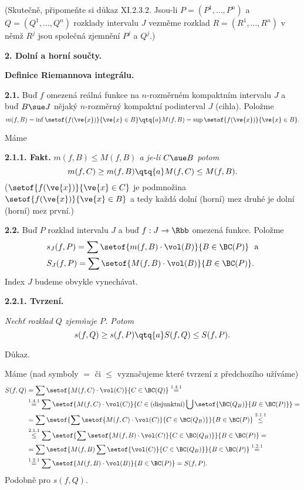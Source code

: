 \documentclass[12pt]{article}
\begin{document}
 (Skutečně, připomeňte si důkaz XI.2.3.2. Jsou-li $P=(P^1,\dots,P^n)$ a  $Q=(Q^1,\dots,Q^n)$ rozklady intervalu $J$
 vezměme rozklad  $R=(R^1,\dots,R^n)$ v němž $R^j$ jsou společná zjemnění $P^j$ a $Q^j$.)
 
 \vskip10mm
 
  
 {\large\bf 2. Dolní a horní součty.}
 
  \medskip
 
 \hskip7mm {\large\bf Definice Riemannova integrálu.}
 
 \bigskip
 
{\bf 2.1.} Buď $f$  omezená reálná funkce na $n$-rozměrném  kompaktním intervalu  $J$ a buď $B\sue J$ nějaký $n$-rozměrný kompaktní podinterval $J$ (cihla). Položme
$$
 m(f,B)=\inf\setof{f(\ve{x})}{\ve{x}\in B} \qtq{a}    M(f,B)=\sup\setof{f(\ve{x})}{\ve{x}\in B}.
 $$
 \smallskip
 
 Máme
 
 \smallskip
 
 {\bf 2.1.1. Fakt.}  {\em $m(f,B)\leq M(f,B)$  a je-li $C\sue B$ potom
 $$
 m(f,C)\geq m(f,B) \qtq{a} M(f,C)\leq M(f,B).
 $$}
 ($\setof{f(\ve{x})}{\ve{x}\in C}$ je podmnožina $\setof{f(\ve{x})}{\ve{x}\in B}$ a  tedy každá dolní (horní) mez druhé je dolní (horní) mez první.)
 
 \bigskip
 
 {\bf 2.2.} Buď $P$ rozklad intervalu $J$ a buď $f:J\to \Rbb$ omezená funkce. Položme
 $$
 \begin{aligned}
 &s_J(f,P)=\sum\setof{m(f,B)\cdot\vol(B)}{B\in\BC(P)}\ \ \text{a}\\ &S_J(f,P)=\sum\setof{M(f,B)\cdot\vol(B)}{B\in\BC(P)}.
 \end{aligned}
 $$
 Index $J$ budeme obvykle vynechávat.
 
 \medskip
 
 {\bf 2.2.1. Tvrzení.} {\em Nechť rozklad $Q$ zjemňuje $P$. Potom
 $$
 s(f,Q)\geq s(f,P) \qtq{a} S(f,Q)\leq S(f,P).
 $$
 
 Důkaz.} Máme (nad symboly $=$ či $\leq$ vyznačujeme které tvrzení z předchozího užíváme)
 $$ 
\begin{aligned} 
S(f,Q)&=\sum\setof{M(f,C)\cdot\vol(C)}{C\in\BC(Q)}\stackrel{1.4.1}{=}\\
&\stackrel{1.4.1}{=}\sum\setof{M(f,C)\cdot\vol(C)}{C\in\text{(disjunktní)}\bigcup\setof{\BC(Q_B)}{B\in\BC(P)}}=\\
&=\sum\setof{\sum\setof{M(f,C)\cdot\vol(C)}{C\in\BC(Q_B)}}{B\in\BC(P)}\stackrel{2.1.1}{\leq}\\
&\stackrel{2.1.1}{\leq}\sum\setof{\sum\setof{M(f,B)\cdot\vol(C)}{C\in\BC(Q_B)}}{B\in\BC(P)}=\\
&=\sum\setof{M(f,B)\sum\setof{\vol(C)}{C\in\BC(Q_B)}}{B\in\BC(P)}\stackrel{1.2.1}{=}\\
&\stackrel{1.2.1}{=}\sum\setof{M(f,B)\cdot\vol(B)}{B\in\BC(P)}= S(f,P).
\end{aligned}
$$
Podobně pro $s(f,Q)$.\sq
\end{document}
